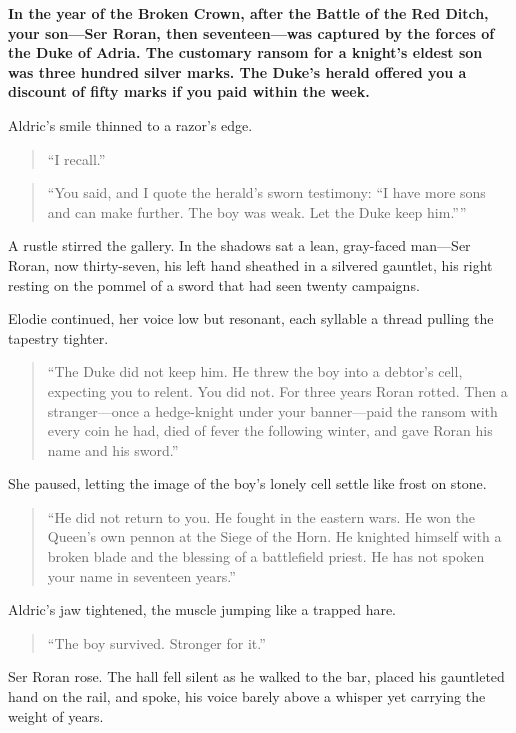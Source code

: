 \documentclass[11pt,twoside]{book}
\begin{document}
\textbf{In the year of the Broken Crown, after the Battle of the Red Ditch, your son---Ser Roran, then seventeen---was captured by the forces of the Duke of Adria. The customary ransom for a knight's eldest son was three hundred silver marks. The Duke's herald offered you a discount of fifty marks if you paid within the week.}

Aldric's smile thinned to a razor's edge.

\begin{quote}
``I recall.''
\end{quote}

\begin{quote}
``You said, and I quote the herald's sworn testimony: ``I have more sons and can make further. The boy was weak. Let the Duke keep him.''''
\end{quote}

A rustle stirred the gallery. In the shadows sat a lean, gray-faced man---Ser Roran, now thirty-seven, his left hand sheathed in a silvered gauntlet, his right resting on the pommel of a sword that had seen twenty campaigns.

Elodie continued, her voice low but resonant, each syllable a thread pulling the tapestry tighter.

\begin{quote}
``The Duke did not keep him. He threw the boy into a debtor's cell, expecting you to relent. You did not. For three years Roran rotted. Then a stranger---once a hedge-knight under your banner---paid the ransom with every coin he had, died of fever the following winter, and gave Roran his name and his sword.''
\end{quote}

She paused, letting the image of the boy's lonely cell settle like frost on stone.

\begin{quote}
``He did not return to you. He fought in the eastern wars. He won the Queen's own pennon at the Siege of the Horn. He knighted himself with a broken blade and the blessing of a battlefield priest. He has not spoken your name in seventeen years.''
\end{quote}

Aldric's jaw tightened, the muscle jumping like a trapped hare.

\begin{quote}
``The boy survived. Stronger for it.''
\end{quote}

Ser Roran rose. The hall fell silent as he walked to the bar, placed his gauntleted hand on the rail, and spoke, his voice barely above a whisper yet carrying the weight of years.
\end{document}
